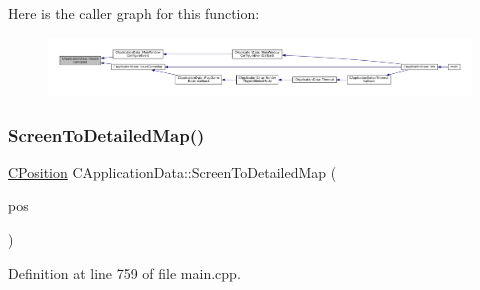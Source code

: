Here is the caller graph for this function\+:\nopagebreak
\begin{figure}[H]
\begin{center}
\leavevmode
\includegraphics[width=350pt]{classCApplicationData_ad8b16ccb099b4996ce9fee34a407c091_icgraph}
\end{center}
\end{figure}
\hypertarget{classCApplicationData_a5c8b0ebf35fddb89b22f035544c32222}{}\label{classCApplicationData_a5c8b0ebf35fddb89b22f035544c32222} 
\subsubsection{\texorpdfstring{Screen\+To\+Detailed\+Map()}{ScreenToDetailedMap()}}
{\footnotesize\ttfamily \hyperlink{classCPosition}{C\+Position} C\+Application\+Data\+::\+Screen\+To\+Detailed\+Map (\begin{DoxyParamCaption}\item[{const \hyperlink{classCPosition}{C\+Position} \&}]{pos }\end{DoxyParamCaption})\hspace{0.3cm}{\ttfamily [protected]}}



Definition at line 759 of file main.\+cpp.


